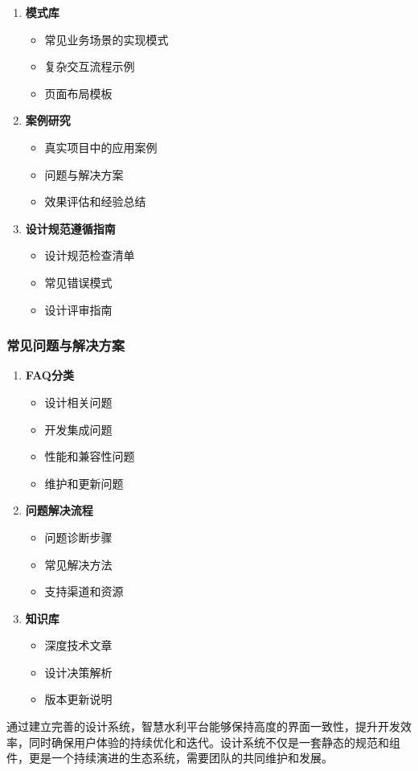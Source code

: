 \begin{enumerate}
\def\labelenumi{\arabic{enumi}.}
\tightlist
\item
  \textbf{模式库}

  \begin{itemize}
  \tightlist
  \item
    常见业务场景的实现模式
  \item
    复杂交互流程示例
  \item
    页面布局模板
  \end{itemize}
\item
  \textbf{案例研究}

  \begin{itemize}
  \tightlist
  \item
    真实项目中的应用案例
  \item
    问题与解决方案
  \item
    效果评估和经验总结
  \end{itemize}
\item
  \textbf{设计规范遵循指南}

  \begin{itemize}
  \tightlist
  \item
    设计规范检查清单
  \item
    常见错误模式
  \item
    设计评审指南
  \end{itemize}
\end{enumerate}

\subsubsection{常见问题与解决方案}\label{ux5e38ux89c1ux95eeux9898ux4e0eux89e3ux51b3ux65b9ux6848}

\begin{enumerate}
\def\labelenumi{\arabic{enumi}.}
\tightlist
\item
  \textbf{FAQ分类}

  \begin{itemize}
  \tightlist
  \item
    设计相关问题
  \item
    开发集成问题
  \item
    性能和兼容性问题
  \item
    维护和更新问题
  \end{itemize}
\item
  \textbf{问题解决流程}

  \begin{itemize}
  \tightlist
  \item
    问题诊断步骤
  \item
    常见解决方法
  \item
    支持渠道和资源
  \end{itemize}
\item
  \textbf{知识库}

  \begin{itemize}
  \tightlist
  \item
    深度技术文章
  \item
    设计决策解析
  \item
    版本更新说明
  \end{itemize}
\end{enumerate}

通过建立完善的设计系统，智慧水利平台能够保持高度的界面一致性，提升开发效率，同时确保用户体验的持续优化和迭代。设计系统不仅是一套静态的规范和组件，更是一个持续演进的生态系统，需要团队的共同维护和发展。
